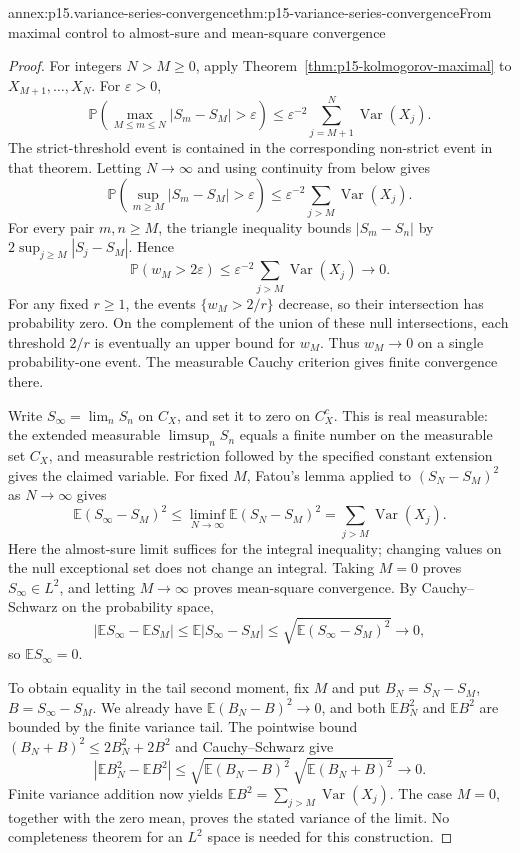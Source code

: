\begin{annexitem}{annex:p15.variance-series-convergence}{thm:p15-variance-series-convergence}{From maximal control to almost-sure and mean-square convergence}
\begin{proof}
For integers \(N>M\geq0\), apply
Theorem~\ref{thm:p15-kolmogorov-maximal} to
\(X_{M+1},\ldots,X_N\). For \(\varepsilon>0\),
\[
 \mathbb P\!\left(\max_{M\leq m\leq N}|S_m-S_M|>\varepsilon\right)
       \leq\varepsilon^{-2}\sum_{j=M+1}^N\operatorname{Var}(X_j).
\]
The strict-threshold event is contained in the corresponding
non-strict event in that theorem. Letting \(N\to\infty\) and
using continuity from below gives
\[
 \mathbb P\!\left(\sup_{m\geq M}|S_m-S_M|>\varepsilon\right)
       \leq\varepsilon^{-2}\sum_{j>M}\operatorname{Var}(X_j).
\]
For every pair \(m,n\geq M\), the triangle inequality bounds
\(|S_m-S_n|\) by \(2\sup_{j\geq M}|S_j-S_M|\). Hence
\[
 \mathbb P(w_M>2\varepsilon)
       \leq\varepsilon^{-2}\sum_{j>M}\operatorname{Var}(X_j)
          \longrightarrow0.
\]
For any fixed \(r\geq1\), the events \(\{w_M>2/r\}\) decrease,
so their intersection has probability zero. On the complement of the
union of these null intersections, each threshold \(2/r\) is
eventually an upper bound for \(w_M\). Thus \(w_M\to0\) on a
single probability-one event. The measurable Cauchy criterion gives
finite convergence there.

Write \(S_\infty=\lim_nS_n\) on \(C_X\), and set it to zero
on \(C_X^c\). This is real measurable: the extended measurable
\(\limsup_nS_n\) equals a finite number on the measurable set
\(C_X\), and measurable restriction followed by the specified
constant extension gives the claimed variable. For fixed \(M\),
Fatou's lemma applied to \((S_N-S_M)^2\) as \(N\to\infty\)
gives
\[
 \mathbb E(S_\infty-S_M)^2
       \leq\liminf_{N\to\infty}\mathbb E(S_N-S_M)^2
       =\sum_{j>M}\operatorname{Var}(X_j).
\]
Here the almost-sure limit suffices for the integral inequality;
changing values on the null exceptional set does not change an
integral. Taking \(M=0\) proves \(S_\infty\in L^2\), and
letting \(M\to\infty\) proves mean-square convergence. By
Cauchy--Schwarz on the probability space,
\[
 |\mathbb ES_\infty-\mathbb ES_M|
       \leq\mathbb E|S_\infty-S_M|
       \leq\sqrt{\mathbb E(S_\infty-S_M)^2}\longrightarrow0,
\]
so \(\mathbb ES_\infty=0\).

To obtain equality in the tail second moment, fix \(M\) and put
\(B_N=S_N-S_M\), \(B=S_\infty-S_M\). We already have
\(\mathbb E(B_N-B)^2\to0\), and both \(\mathbb EB_N^2\)
and \(\mathbb EB^2\) are bounded by the finite variance tail.
The pointwise bound \((B_N+B)^2\leq2B_N^2+2B^2\) and
Cauchy--Schwarz give
\[
 |\mathbb EB_N^2-\mathbb EB^2|
 \leq\sqrt{\mathbb E(B_N-B)^2}\,
          \sqrt{\mathbb E(B_N+B)^2}\longrightarrow0.
\]
Finite variance addition now yields
\(\mathbb EB^2=\sum_{j>M}\operatorname{Var}(X_j)\).
The case \(M=0\), together with the zero mean, proves the stated
variance of the limit. No completeness theorem for an \(L^2\)
space is needed for this construction.
\end{proof}
\end{annexitem}

